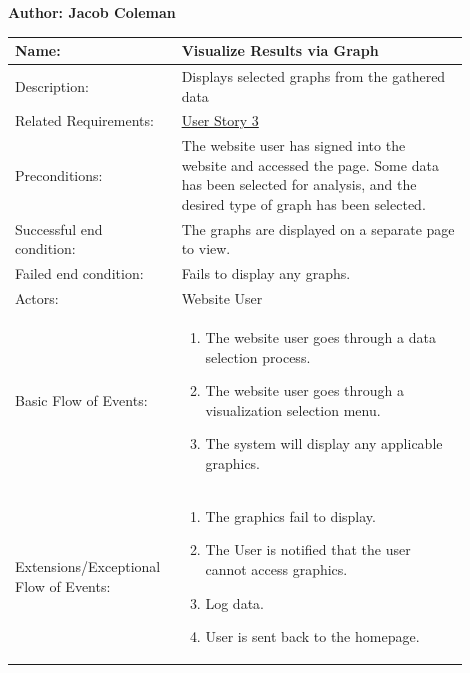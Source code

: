 \documentclass[11pt]{article}
\begin{document}
\begin{table}[!ht]
\begin{center}
\textbf{Author: Jacob Coleman}
\vspace*{1em}

\begin{tabular}{p{0.30\linewidth}p{0.60\linewidth}}
	Name: & Visualize Results via Graph\\\hline
	Description: & Displays selected graphs from the gathered data\\\hline
	Related Requirements:& \hyperlink{us3}{User Story 3}\\\hline
	Preconditions:& The website user has signed into the website and accessed the page. Some data has been selected for analysis, and the desired type of graph has been selected.\\\hline
	Successful end condition:& The graphs are displayed on a separate page to view.\\\hline
	Failed end condition:& Fails to display any graphs.\\\hline
	Actors:& Website User\\\hline
	Basic Flow of Events: & 
	\begin{enumerate}
	\item The website user goes through a data selection process.
	\item The website user goes through a visualization selection menu.
	\item The system will display any applicable graphics.
	\end{enumerate}\\\hline
	Extensions/Exceptional Flow of Events: & 
	\begin{enumerate}
	\item The graphics fail to display.
	\item The User is notified that the user cannot access graphics.
	\item Log data.
	\item User is sent back to the homepage.
	\end{enumerate}
\end{tabular}
\label{des:vis_res}	
\end{center}
\end{table}
\end{document}
